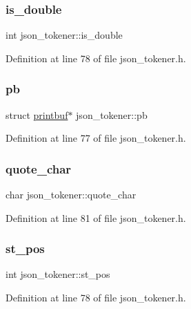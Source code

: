 \subsubsection{\texorpdfstring{is\+\_\+double}{is\_double}}
{\footnotesize\ttfamily int json\+\_\+tokener\+::is\+\_\+double}



Definition at line 78 of file json\+\_\+tokener.\+h.

\mbox{\label{structjson__tokener_a1cdc7f85d7bde95f81bb08b7e61d6684}} 
\subsubsection{\texorpdfstring{pb}{pb}}
{\footnotesize\ttfamily struct \hyperlink{structprintbuf}{printbuf}$\ast$ json\+\_\+tokener\+::pb}



Definition at line 77 of file json\+\_\+tokener.\+h.

\mbox{\label{structjson__tokener_aea488b73085ac7c5969ae7fc29e25fa0}} 
\subsubsection{\texorpdfstring{quote\+\_\+char}{quote\_char}}
{\footnotesize\ttfamily char json\+\_\+tokener\+::quote\+\_\+char}



Definition at line 81 of file json\+\_\+tokener.\+h.

\mbox{\label{structjson__tokener_a8eed213c0a37d09c1df66c8567e44471}} 
\subsubsection{\texorpdfstring{st\+\_\+pos}{st\_pos}}
{\footnotesize\ttfamily int json\+\_\+tokener\+::st\+\_\+pos}



Definition at line 78 of file json\+\_\+tokener.\+h.

